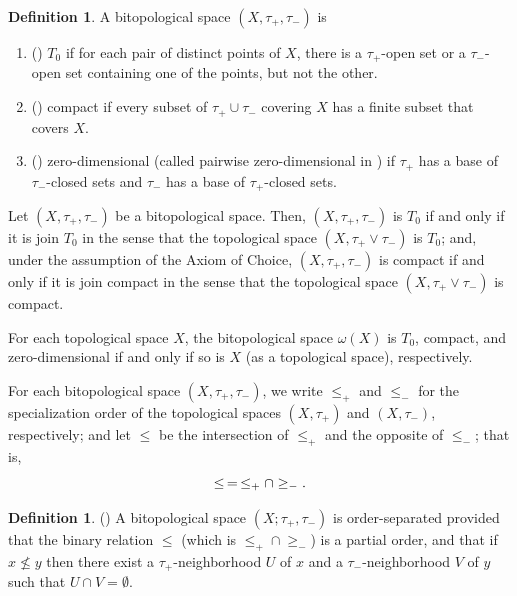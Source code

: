 \documentclass[11pt]{article}
\theoremstyle{plain}
\theoremstyle{definition}
\newtheorem{defn}[thm]{Definition}
\begin{document}
\begin{defn}\label{compact bitop}
A bitopological space $(X,\tau_+,\tau_-)$ is
\begin{enumerate}[label=\rm(\roman*)] \setlength{\itemsep}{0pt}
\item (\cite{Mu})  $T_0$ if for each pair of distinct points of $X$, there is a $\tau_+$-open set or a
$\tau_-$-open set containing one of the points, but not the other.
\item (\cite{Swart}) \label{join compactness}  compact if every subset of $\tau_+\cup\tau_-$  covering $X$ has a finite subset that covers $X$.
 
\item \label{zero-dimensionality} (\cite{Reilly}) zero-dimensional (called pairwise zero-dimensional in \cite{Reilly}) if $\tau_{+}$ has a base of $\tau_{-}$-closed sets and $\tau_{-}$ has a base of $\tau_{+}$-closed sets. 
\end{enumerate}
\end{defn}
 
Let $(X,\tau_+,\tau_-)$  be a bitopological space. Then, $(X,\tau_+,\tau_-)$ is $T_0$  if and only if it is join $T_0$ \cite{Lal} in the sense that the topological space $(X,\tau_{+}\vee\tau_{-})$ is $T_0$;  and, under the assumption of the Axiom of Choice,  $(X,\tau_+,\tau_-)$ is compact if and only if it is join compact in the sense that the topological space $(X, \tau_{+}\vee \tau_{-})$ is compact.  

For each topological space $X$, the bitopological space $\omega(X)$ is $T_0$,   compact, and zero-dimensional if and only if so is $X$  (as a topological space),  respectively.
  
For each bitopological space $(X,\tau_+,\tau_-)$, we write $\leq_+$ and $\leq_-$ for the specialization order of the topological spaces $(X,\tau_+)$ and $(X,\tau_-)$, respectively; and let $\leq$ be the intersection of $\leq_+$ and the opposite of $\leq_-$; that is, $$\leq\thinspace = \thinspace\leq_+\cap \geq_-.$$ 

\begin{defn}\label{order separated}  (\cite[Definition 3.7] {JM2008})
A  bitopological space $(X;\tau_{+},\tau_{-})$ is order-separated provided that the binary relation $\leq$ (which is $\leq_+\cap \geq_-$) is a partial order, and  that if $x\not\leq  y$ then there exist a $\tau_+$-neighborhood $U$ of $x$ and a $\tau_-$-neighborhood $V$ of $y$ such that  $U\cap V=\emptyset$.   
\end{defn}
\end{document}
